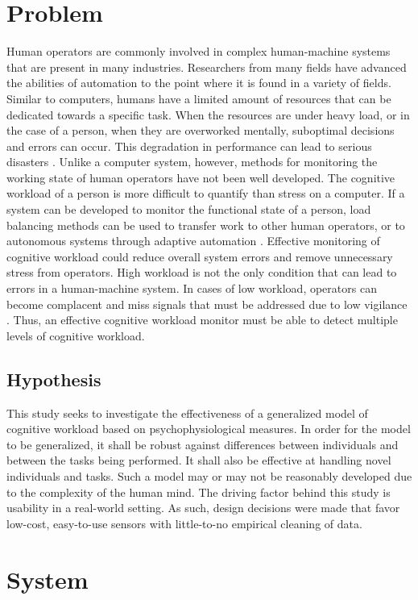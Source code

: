 \documentclass[11pt]{artikel3}
\begin{document}
\section{Problem}
Human operators are commonly involved in complex human-machine systems that are present in many industries. Researchers from many fields have advanced the abilities of automation to the point where it is found in a variety of fields. Similar to computers, humans have a limited amount of resources that can be dedicated towards a specific task. When the resources are under heavy load, or in the case of a person, when they are overworked mentally, suboptimal decisions and errors can occur. This degradation in performance can lead to serious disasters \cite{Wickens}. Unlike a computer system, however, methods for monitoring the working state of human operators have not been well developed. The cognitive workload of a person is more difficult to quantify than stress on a computer. If a system can be developed to monitor the functional state of a person, load balancing methods can be used to transfer work to other human operators, or to autonomous systems through adaptive automation \cite{Wilson}. Effective monitoring of cognitive workload could reduce overall system errors and remove unnecessary stress from operators. High workload is not the only condition that can lead to errors in a human-machine system. In cases of low workload, operators can become complacent and miss signals that must be addressed due to low vigilance \cite{Parasuraman}. Thus, an effective cognitive workload monitor must be able to detect multiple levels of cognitive workload.

\subsection{Hypothesis}
This study seeks to investigate the effectiveness of a generalized model of cognitive workload based on psychophysiological measures. In order for the model to be generalized, it shall be robust against differences between individuals and between the tasks being performed. It shall also be effective at handling novel individuals and tasks. Such a model may or may not be reasonably developed due to the complexity of the human mind. The driving factor behind this study is usability in a real-world setting. As such, design decisions were made that favor low-cost, easy-to-use sensors with little-to-no empirical cleaning of data. 

\section{System}
\end{document}
